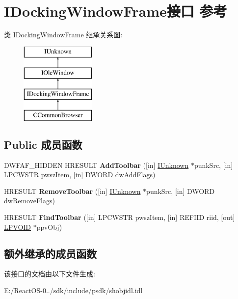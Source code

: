 \hypertarget{interface_i_docking_window_frame}{}\section{I\+Docking\+Window\+Frame接口 参考}
\label{interface_i_docking_window_frame}
类 I\+Docking\+Window\+Frame 继承关系图\+:\begin{figure}[H]
\begin{center}
\leavevmode
\includegraphics[height=4.000000cm]{interface_i_docking_window_frame}
\end{center}
\end{figure}
\subsection*{Public 成员函数}
\begin{DoxyCompactItemize}
\item 
\mbox{\label{interface_i_docking_window_frame_adb63133cd85580a2403be63710b0378f}} 
D\+W\+F\+A\+F\+\_\+\+H\+I\+D\+D\+EN H\+R\+E\+S\+U\+LT {\bfseries Add\+Toolbar} (\mbox{[}in\mbox{]} \hyperlink{interface_i_unknown}{I\+Unknown} $\ast$punk\+Src, \mbox{[}in\mbox{]} L\+P\+C\+W\+S\+TR pwsz\+Item, \mbox{[}in\mbox{]} D\+W\+O\+RD dw\+Add\+Flags)
\item 
\mbox{\label{interface_i_docking_window_frame_adf2a49885d098617878a4ea73c8cff0e}} 
H\+R\+E\+S\+U\+LT {\bfseries Remove\+Toolbar} (\mbox{[}in\mbox{]} \hyperlink{interface_i_unknown}{I\+Unknown} $\ast$punk\+Src, \mbox{[}in\mbox{]} D\+W\+O\+RD dw\+Remove\+Flags)
\item 
\mbox{\label{interface_i_docking_window_frame_a8c3507d50eef614775e435f8ff8909e6}} 
H\+R\+E\+S\+U\+LT {\bfseries Find\+Toolbar} (\mbox{[}in\mbox{]} L\+P\+C\+W\+S\+TR pwsz\+Item, \mbox{[}in\mbox{]} R\+E\+F\+I\+ID riid, \mbox{[}out\mbox{]} \hyperlink{interfacevoid}{L\+P\+V\+O\+ID} $\ast$ppv\+Obj)
\end{DoxyCompactItemize}
\subsection*{额外继承的成员函数}


该接口的文档由以下文件生成\+:\begin{DoxyCompactItemize}
\item 
E\+:/\+React\+O\+S-\/0../sdk/include/psdk/shobjidl.\+idl\end{DoxyCompactItemize}
